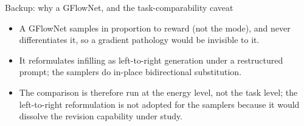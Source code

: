 \documentclass{beamer}
\begin{document}
\begin{frame}[noframenumbering]{Backup: why a GFlowNet, and the task-comparability caveat}
  \small
  \begin{itemize}
    \item A GFlowNet samples in proportion to reward (not the mode), and never differentiates it, so a gradient pathology would be invisible to it.
    \item It reformulates infilling as left-to-right generation under a restructured prompt; the samplers do in-place bidirectional substitution.
    \item The comparison is therefore run at the energy level, not the task level; the left-to-right reformulation is not adopted for the samplers because it would dissolve the revision capability under study.
  \end{itemize}
\end{frame}
\end{document}

